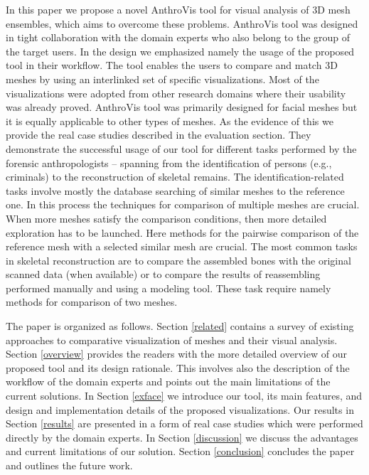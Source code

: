 \documentclass[final,5p,times]{elsarticle}
\begin{document}
In this paper we propose a novel AnthroVis tool for visual analysis of 3D mesh ensembles, which aims to overcome these problems.
AnthroVis tool was designed in tight collaboration with the domain experts who also belong to the group of the target users.
In the design we emphasized namely the usage of the proposed tool in their workflow. 
The tool enables the users to compare and match 3D meshes by using an interlinked set of specific visualizations.
Most of the visualizations were adopted from other research domains where their usability was already proved. 
AnthroVis tool was primarily designed for facial meshes but it is equally applicable to other types of meshes.
As the evidence of this we provide the real case studies described in the evaluation section.
They demonstrate the successful usage of our tool for different tasks performed by the forensic anthropologists -- spanning from the identification of persons (e.g., criminals) to the reconstruction of skeletal remains.
The identification-related tasks involve mostly the database searching of similar meshes to the reference one. 
In this process the techniques for comparison of multiple meshes are crucial.
When more meshes satisfy the comparison conditions, then more detailed exploration has to be launched.
Here methods for the pairwise comparison of the reference mesh with a selected similar mesh are crucial.  
The most common tasks in skeletal reconstruction are to compare the assembled bones with the original scanned data (when available) or to compare the results of reassembling performed manually and using a modeling tool.
These task require namely methods for comparison of two meshes.

The paper is organized as follows. 
Section \ref{related} contains a survey of existing approaches to comparative visualization of meshes and their visual analysis.
Section \ref{overview} provides the readers with the more detailed overview of our proposed tool and its design rationale.
This involves also the description of the workflow of the domain experts and points out the main limitations of the current solutions.
In Section \ref{exface} we introduce our tool, its main features, and design and implementation details of the proposed visualizations.
Our results in Section \ref{results} are presented in a form of real case studies which were performed directly by the domain experts.
In Section \ref{discussion} we discuss the advantages and current limitations of our solution.
Section \ref{conclusion} concludes the paper and outlines the future work.
\end{document}
